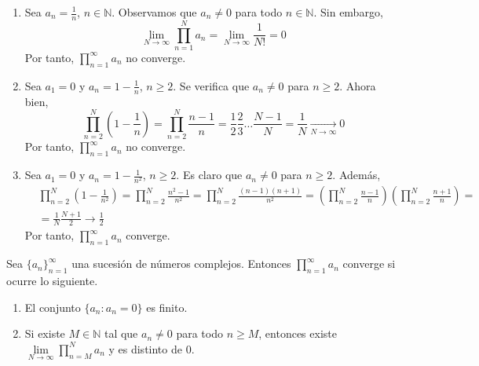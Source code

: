 \begin{example}
    \hfill
    \begin{enumerate}
        \item Sea $a_n = \frac{1}{n}$, $n \in \mathbb{N}$.
              Observamos que $a_n \neq 0$ para todo $n \in \mathbb{N}$.
              Sin embargo,
              $$\lim_{N \to \infty} \prod_{n=1}^N a_n = \lim_{N \to \infty} \frac{1}{N!} = 0$$
              Por tanto, $\prod_{n=1}^\infty a_n$ no converge.

        \item Sea $a_1 = 0$ y $a_n = 1 - \frac{1}{n}$, $n \geq 2$.
              Se verifica que $a_n \neq 0$ para $n \geq 2$.
              Ahora bien,
              $$\prod_{n=2}^N \left(1-\frac{1}{n}\right) = \prod_{n=2}^N \frac{n-1}{n} = \frac{1}{2}\frac{2}{3}\dots\frac{N-1}{N} = \frac{1}{N} \xrightarrow[N \to \infty]{} 0$$
              Por tanto, $\prod_{n=1}^\infty a_n$ no converge.

        \item Sea $a_1 = 0$ y $a_n = 1 - \frac{1}{n^2}$, $n \geq 2$.
              Es claro que $a_n \neq 0$ para $n \geq 2$.
              Además,
              \begin{align*}
                   & \prod_{n=2}^N \left(1-\frac{1}{n^2}\right) = \prod_{n=2}^N \frac{n^2-1}{n^2} = \prod_{n=2}^N \frac{(n-1)(n+1)}{n^2} = \left(\prod_{n=2}^N \frac{n-1}{n}\right)\left(\prod_{n=2}^N \frac{n+1}{n}\right) = \\
                   & = \frac{1}{N}\frac{N+1}{2} \to \frac{1}{2}
              \end{align*}
              Por tanto, $\prod_{n=1}^\infty a_n$ converge.
    \end{enumerate}
\end{example}

\begin{theorem}
    Sea $\{a_n\}_{n=1}^\infty$ una sucesión de números complejos.
    Entonces $\prod_{n=1}^\infty a_n$ converge si ocurre lo siguiente.
    \begin{enumerate}
        \item El conjunto $\{a_n : a_n = 0\}$ es finito.
        \item Si existe $M \in \mathbb{N}$ tal que $a_n \neq 0$ para todo $n \geq M$, entonces existe $\lim\limits_{N \to \infty} \prod_{n=M}^N a_n$ y es distinto de 0.
    \end{enumerate}
\end{theorem}

